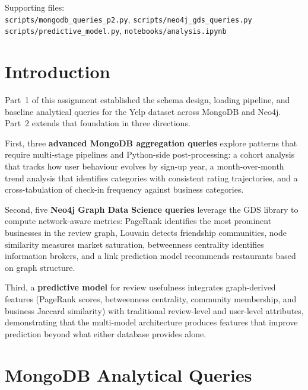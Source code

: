 \documentclass[11pt]{article}
\begin{document}
\begin{titlepage}
\vfill
\begin{center}
\small
\parbox{0.92\linewidth}{Supporting files:\\
\texttt{scripts/mongodb\_queries\_p2.py}, \texttt{scripts/neo4j\_gds\_queries.py}\\
\texttt{scripts/predictive\_model.py}, \texttt{notebooks/analysis.ipynb}}
\end{center}
\end{titlepage}
\clearpage
{}
\hypersetup{pageanchor=true}
\tableofcontents
\clearpage
{}

\section{Introduction}

Part~1 of this assignment established the schema design, loading pipeline, and baseline analytical queries for the Yelp dataset across MongoDB and Neo4j. Part~2 extends that foundation in three directions.

First, three \textbf{advanced MongoDB aggregation queries} explore patterns that require multi-stage pipelines and Python-side post-processing: a cohort analysis that tracks how user behaviour evolves by sign-up year, a month-over-month trend analysis that identifies categories with consistent rating trajectories, and a cross-tabulation of check-in frequency against business categories.

Second, five \textbf{Neo4j Graph Data Science queries} leverage the GDS library to compute network-aware metrics: PageRank identifies the most prominent businesses in the review graph, Louvain detects friendship communities, node similarity measures market saturation, betweenness centrality identifies information brokers, and a link prediction model recommends restaurants based on graph structure.

Third, a \textbf{predictive model} for review usefulness integrates graph-derived features (PageRank scores, betweenness centrality, community membership, and business Jaccard similarity) with traditional review-level and user-level attributes, demonstrating that the multi-model architecture produces features that improve prediction beyond what either database provides alone.

\clearpage
\section{MongoDB Analytical Queries}
\end{document}
